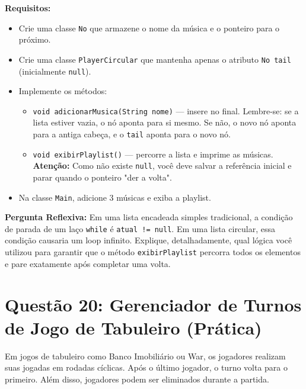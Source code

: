 \documentclass[12pt, a4paper]{article}
\begin{document}
\textbf{Requisitos:}
\begin{itemize}
    \item Crie uma classe \texttt{No} que armazene o nome da música e o ponteiro para o próximo.
    \item Crie uma classe \texttt{PlayerCircular} que mantenha apenas o atributo \texttt{No tail} (inicialmente \texttt{null}).
    \item Implemente os métodos:
    \begin{itemize}
        \item \texttt{void adicionarMusica(String nome)} — insere no final. Lembre-se: se a lista estiver vazia, o nó aponta para si mesmo. Se não, o novo nó aponta para a antiga cabeça, e o \texttt{tail} aponta para o novo nó.
        \item \texttt{void exibirPlaylist()} — percorre a lista e imprime as músicas. \textbf{Atenção:} Como não existe \texttt{null}, você deve salvar a referência inicial e parar quando o ponteiro "der a volta".
    \end{itemize}
    \item Na classe \texttt{Main}, adicione 3 músicas e exiba a playlist.
\end{itemize}

\textbf{Pergunta Reflexiva:} Em uma lista encadeada simples tradicional, a condição de parada de um laço \texttt{while} é \texttt{atual != null}. Em uma lista circular, essa condição causaria um loop infinito. Explique, detalhadamente, qual lógica você utilizou para garantir que o método \texttt{exibirPlaylist} percorra todos os elementos e pare exatamente após completar uma volta.

\vspace{0.2cm}

\section*{Questão 20: Gerenciador de Turnos de Jogo de Tabuleiro (Prática)}
Em jogos de tabuleiro como Banco Imobiliário ou War, os jogadores realizam suas jogadas em rodadas cíclicas. Após o último jogador, o turno volta para o primeiro. Além disso, jogadores podem ser eliminados durante a partida.
\end{document}
